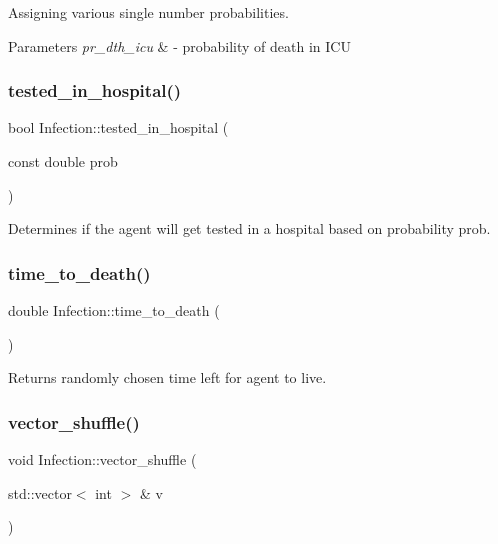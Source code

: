 Assigning various single number probabilities. 


\begin{DoxyParams}{Parameters}
{\em pr\+\_\+dth\+\_\+icu} & -\/ probability of death in I\+CU \\
\hline
\end{DoxyParams}
\mbox{\label{classInfection_a138e3f760822833a0358537e86ea5836}} 
\subsubsection{\texorpdfstring{tested\+\_\+in\+\_\+hospital()}{tested\_in\_hospital()}}
{\footnotesize\ttfamily bool Infection\+::tested\+\_\+in\+\_\+hospital (\begin{DoxyParamCaption}\item[{const double}]{prob }\end{DoxyParamCaption})}



Determines if the agent will get tested in a hospital based on probability prob. 

\mbox{\label{classInfection_a926eaa505c376d8823c510873d606d90}} 
\subsubsection{\texorpdfstring{time\+\_\+to\+\_\+death()}{time\_to\_death()}}
{\footnotesize\ttfamily double Infection\+::time\+\_\+to\+\_\+death (\begin{DoxyParamCaption}{ }\end{DoxyParamCaption})}



Returns randomly chosen time left for agent to live. 

\mbox{\label{classInfection_a30cb53ab87d26e8822aa5b8c6f7fc559}} 
\subsubsection{\texorpdfstring{vector\+\_\+shuffle()}{vector\_shuffle()}}
{\footnotesize\ttfamily void Infection\+::vector\+\_\+shuffle (\begin{DoxyParamCaption}\item[{std\+::vector$<$ int $>$ \&}]{v }\end{DoxyParamCaption})\hspace{0.3cm}{\ttfamily [inline]}}



